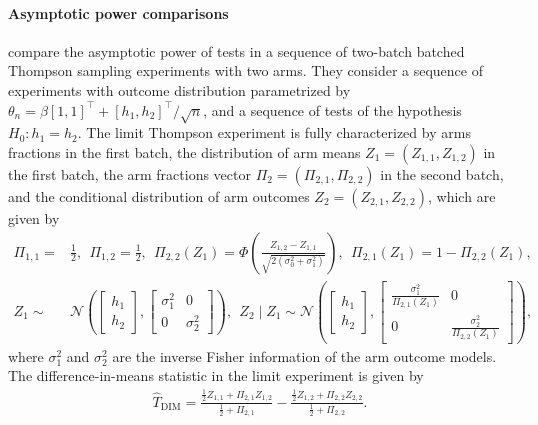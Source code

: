 \paragraph{Asymptotic power comparisons} \cite{hirano2023asymptotic}
compare the asymptotic power of tests in a sequence of two-batch batched Thompson sampling experiments with two arms. They consider a sequence of experiments with outcome distribution parametrized by $\theta_n = \beta [1, 1]^\top + [h_1, h_2]^\top / \sqrt{n}$, and a sequence of tests of the hypothesis $H_0 : h_1 = h_2$.
The limit Thompson experiment is fully characterized by arms fractions in the first batch, the distribution of arm means $Z_1=(Z_{1,1},Z_{1,2})$ in the first batch, the arm fractions vector $\Pi_2=(\Pi_{2,1}, \Pi_{2,2})$ in the second batch, and the conditional distribution of arm outcomes $Z_2=(Z_{2,1}, Z_{2,2})$, which are given by
\begin{align*}
\Pi_{1,1} =& \frac{1}{2}, ~~ \Pi_{1,2} = \frac{1}{2}, ~~
    \Pi_{2,2}(Z_1) = \Phi\left( \frac{Z_{1,2} -  Z_{1,1}}{\sqrt{2 (\sigma_0^2 + \sigma_1^2)}} \right) ,~~ \Pi_{2,1}(Z_1) = 1 - \Pi_{2,2}(Z_1),\\
    Z_1 \sim&  \mathcal{N} \left( 
    \begin{bmatrix} 
        h_1 \\ 
        h_2 
    \end{bmatrix}, 
    \begin{bmatrix}
        \sigma_1^2 & 0 \\
        0 & \sigma_2^2
    \end{bmatrix}
    \right),~~
    Z_2 \mid  Z_1 \sim  \mathcal{N} \left( 
    \begin{bmatrix}
        h_1 \\
        h_2
    \end{bmatrix},
    \begin{bmatrix}
        \frac{\sigma_1^2}{\Pi_{2,1}(Z_1)} & 0 \\
        0 & \frac{\sigma_2^2}{\Pi_{2,2}(Z_1)}
    \end{bmatrix}
    \right),
\end{align*}
where $\sigma_1^2$ and $\sigma_2^2$ are the inverse Fisher information of the arm outcome models. The difference-in-means statistic in the limit experiment is given by 
\begin{align*}
    \hat{T}_{\mathrm{DIM}} = \frac{\frac{1}{2} Z_{1,1} + \Pi_{2,1} Z_{1,2}}{\frac{1}{2} +  \Pi_{2,1}} - \frac{\frac{1}{2} Z_{1,2} + \Pi_{2,2} Z_{2,2}}{\frac{1}{2} +  \Pi_{2,2}}.
\end{align*}
